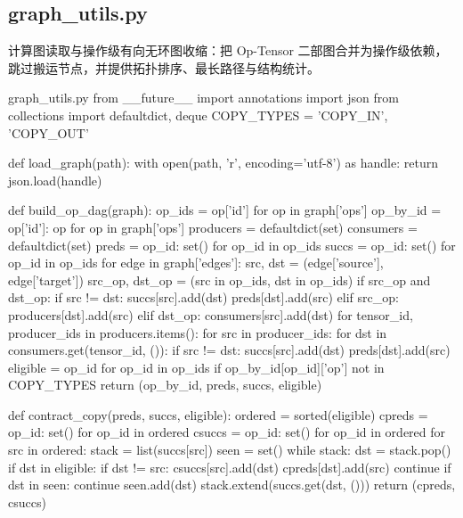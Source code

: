 
\subsection{graph\_utils.py}

计算图读取与操作级有向无环图收缩：把 Op-Tensor 二部图合并为操作级依赖，跳过搬运节点，并提供拓扑排序、最长路径与结构统计。

\begin{Python}{graph\_utils.py}
from __future__ import annotations
import json
from collections import defaultdict, deque
COPY_TYPES = {'COPY_IN', 'COPY_OUT'}

def load_graph(path):
    with open(path, 'r', encoding='utf-8') as handle:
        return json.load(handle)

def build_op_dag(graph):
    op_ids = {op['id'] for op in graph['ops']}
    op_by_id = {op['id']: op for op in graph['ops']}
    producers = defaultdict(set)
    consumers = defaultdict(set)
    preds = {op_id: set() for op_id in op_ids}
    succs = {op_id: set() for op_id in op_ids}
    for edge in graph['edges']:
        src, dst = (edge['source'], edge['target'])
        src_op, dst_op = (src in op_ids, dst in op_ids)
        if src_op and dst_op:
            if src != dst:
                succs[src].add(dst)
                preds[dst].add(src)
        elif src_op:
            producers[dst].add(src)
        elif dst_op:
            consumers[src].add(dst)
    for tensor_id, producer_ids in producers.items():
        for src in producer_ids:
            for dst in consumers.get(tensor_id, ()):
                if src != dst:
                    succs[src].add(dst)
                    preds[dst].add(src)
    eligible = {op_id for op_id in op_ids if op_by_id[op_id]['op'] not in COPY_TYPES}
    return (op_by_id, preds, succs, eligible)

def contract_copy(preds, succs, eligible):
    ordered = sorted(eligible)
    cpreds = {op_id: set() for op_id in ordered}
    csuccs = {op_id: set() for op_id in ordered}
    for src in ordered:
        stack = list(succs[src])
        seen = set()
        while stack:
            dst = stack.pop()
            if dst in eligible:
                if dst != src:
                    csuccs[src].add(dst)
                    cpreds[dst].add(src)
                continue
            if dst in seen:
                continue
            seen.add(dst)
            stack.extend(succs.get(dst, ()))
    return (cpreds, csuccs)


\end{Python}
